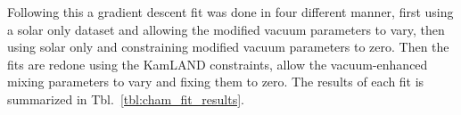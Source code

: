 Following this a gradient descent fit was done in four different manner,
first using a solar only dataset and allowing the modified vacuum parameters
to vary, then using solar only and constraining modified vacuum parameters
to zero. Then the fits are redone using the KamLAND constraints, allow 
the vacuum-enhanced mixing parameters to vary and fixing them to zero.
The results of each fit is summarized in Tbl.~\ref{tbl:cham_fit_results}.













%
%
%
